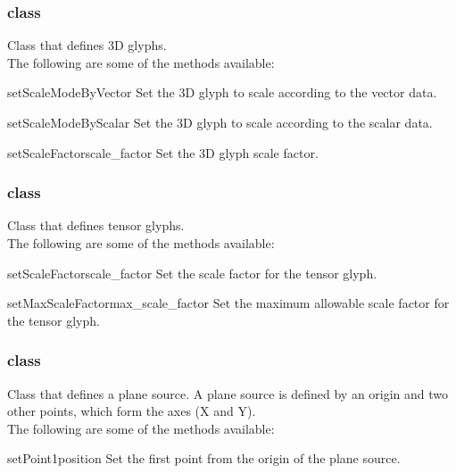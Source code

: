 \subsubsection{\GlyphThreeD class}
Class that defines 3D glyphs. \\

The following are some of the methods available:

\begin{methoddesc}[Glyph3D]{setScaleModeByVector}{}
Set the 3D glyph to scale according to the vector data.
\end{methoddesc}

\begin{methoddesc}[Glyph3D]{setScaleModeByScalar}{}
Set the 3D glyph to scale according to the scalar data.
\end{methoddesc}

\begin{methoddesc}[Glyph3D]{setScaleFactor}{scale_factor}
Set the 3D glyph scale factor.
\end{methoddesc}

\subsubsection{\TensorGlyph class}
Class that defines tensor glyphs. \\

The following are some of the methods available:

\begin{methoddesc}[TensorGlyph]{setScaleFactor}{scale_factor}
Set the scale factor for the tensor glyph.
\end{methoddesc}

\begin{methoddesc}[TensorGlyph]{setMaxScaleFactor}{max_scale_factor}
Set the maximum allowable scale factor for the tensor glyph.
\end{methoddesc}

\subsubsection{\PlaneSource class}
Class that defines a plane source.  A plane source is defined by an origin
and two other points, which form the axes (X and Y). \\

The following are some of the methods available:

\begin{methoddesc}[PlaneSource]{setPoint1}{position}
Set the first point from the origin of the plane source.
\end{methoddesc}

